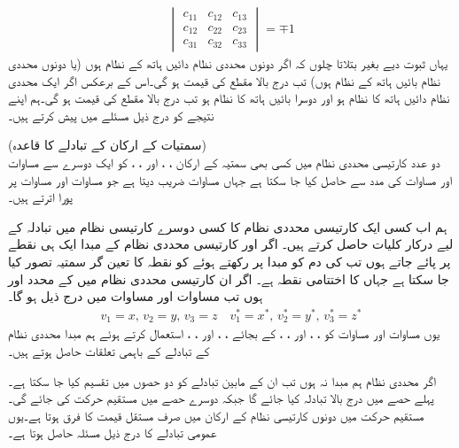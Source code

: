 \begin{align}\label{مساوات_الاحصاء_عددی_سر_شرط_ب}
\begin{vmatrix}
c_{11}&c_{12}&c_{13}\\
c_{12}&c_{22}&c_{23}\\
c_{31}&c_{32}&c_{33}
\end{vmatrix}=\mp 1
\end{align} 
 یہاں ثبوت دیے بغیر بتلاتا چلوں کہ اگر دونوں محددی نظام دائیں ہاتھ کے نظام ہوں (یا دونوں محددی نظام بائیں ہاتھ کے نظام ہوں) تب درج بالا مقطع کی قیمت  ہو گی۔اس کے برعکس اگر ایک محددی نظام دائیں ہاتھ کا نظام ہو اور دوسرا بائیں ہاتھ کا نظام ہو تب درج بالا مقطع کی قیمت  ہو گی۔ہم اپنے نتیجے کو درج ذیل مسئلے میں پیش کرتے ہیں۔

\quad (سمتیات کے ارکان کے تبادلے کا قاعدہ)\\
دو عدد کارتیسی محددی نظام میں کسی بھی سمتیہ  کے  ارکان ، ،  اور ، ،  کو ایک دوسرے سے مساوات  اور مساوات  کی مدد سے حاصل کیا جا سکتا ہے جہاں مساوات   ضریب   دیتا ہے جو مساوات  اور مساوات  پر پورا اترتے ہیں۔ 

ہم اب کسی ایک کارتیسی محددی نظام کا کسی دوسرے کارتیسی نظام میں تبادلہ کے لیے درکار کلیات حاصل کرتے ہیں۔ اگر  اور  کارتیسی محددی نظام کے مبدا ایک ہی نقطے پر پائے جاتے ہوں تب  کی دم کو مبدا پر رکھتے ہوئے  کو نقطہ  کا تعین گر سمتیہ تصور کیا جا سکتا ہے جہاں  کا اختتامی نقطہ  ہے۔ اگر ان کارتیسی محددی نظام میں  کے محدد  اور  ہوں تب مساوات  اور مساوات  میں درج ذیل ہو گا۔
\begin{align*}
v_1=x, \, v_2=y,\, v_3=z\quad v_1^*=x^*,\, v_2^*=y^*,\, v_3^*=z^*
\end{align*}
یوں مساوات  اور مساوات  کو ، ،   اور 
، ،   کے بجائے ، ،  اور ، ،  استعمال کرتے ہوئے ہم مبدا محددی نظام کے تبادلے کے باہمی تعلقات حاصل ہوتے ہیں۔

اگر محددی نظام ہم مبدا نہ ہوں تب ان کے مابین تبادلے کو دو حصوں میں تقسیم کیا جا سکتا ہے۔پہلے حصے میں درج بالا تبادلہ کیا جائے گا جبکہ دوسرے حصے میں مستقیم حرکت  کی جائے گی۔ مستقیم حرکت میں دونوں کارتیسی نظام کے ارکان میں صرف مستقل قیمت کا فرق ہوتا ہے۔یوں عمومی تبادلے کا درج ذیل مسئلہ حاصل ہوتا ہے۔

